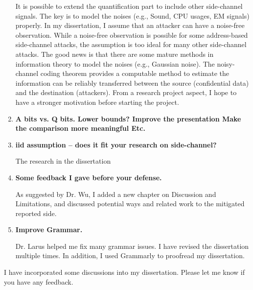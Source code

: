 \documentclass{article}
\begin{document}
\begin{enumerate}
It is possible to extend the quantification part to include other side-channel signals. The key is to model the noises (e.g., Sound, CPU usages, EM signals) properly. In my dissertation, I assume that an attacker can have a noise-free observation. While a noise-free observation is possible for some address-based side-channel attacks, the assumption is too ideal for many other side-channel attacks. The good news is that there are some mature methods in information theory to model the noises (e.g., Gaussian noise). The noisy-channel coding theorem provides a computable method to estimate the information can be reliably transferred between the source (confidential data) and the destination (attackers). From a research project aspect, I hope to have a stronger motivation before starting the project. 
\item \textbf{A bits vs. Q bits. Lower bounds?
       Improve the presentation
       Make the comparison more meaningful
       Etc.}
\item \textbf{iid assumption – does it fit your research on side-channel?}

The research in the dissertation 


\item \textbf{Some feedback I gave before your defense.}

As suggested by Dr. Wu, I added a new chapter on Discussion and Limitations, and discussed potential ways and related work to the mitigated reported side.

\item \textbf{Improve Grammar.}

Dr. Larus helped me fix many grammar issues. I have revised the dissertation multiple times. In addition, I used Grammarly to proofread my dissertation.
\end{enumerate}

I have incorporated some discussions into my dissertation. Please let me know if you have any feedback.
\end{document}
